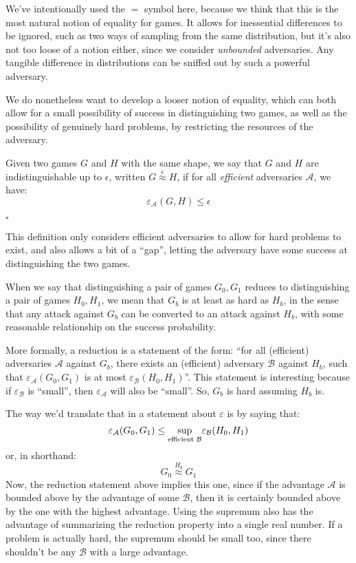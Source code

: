 We've intentionally used the $=$ symbol here, because we think that
this is the most natural notion of equality for games.
It allows for inessential differences to be ignored,
such as two ways of sampling from the same distribution,
but it's also not too loose of a notion either, since we consider
\emph{unbounded} adversaries.
Any tangible difference in distributions can be sniffed out by
such a powerful adversary.

We do nonetheless want to develop a looser notion of equality,
which can both allow for a small possibility of success
in distinguishing two games, as well as the possibility of genuinely
hard problems, by restricting the resources of the adversary.

\begin{definition}
    Given two games $G$ and $H$ with the same shape,
    we say that $G$ and $H$ are indistinguishable up to $\epsilon$,
    written $G \overset{\epsilon}{\approx} H$, if for all \emph{efficient}
    adversaries $\mathcal{A}$, we have:
    $$
    \varepsilon_{\mathcal{A}}(G, H) \leq \epsilon
    $$

    $\square$
\end{definition}

This definition only considers efficient adversaries to allow for
hard problems to exist, and also allows a bit of a ``gap'',
letting the adversary have some success at distinguishing
the two games.

When we say that distinguishing a pair of games $G_0, G_1$ reduces
to distinguishing a pair of games $H_0, H_1$, we mean that
$G_b$ is at least as hard as $H_b$, in the sense that
any attack against $G_b$ can be converted to an attack against $H_b$,
with some reasonable relationship on the success probability.

More formally, a reduction is a statement of the form:
``for all (efficient) adversaries $\mathcal{A}$
against $G_b$, there exists an (efficient) adversary $\mathcal{B}$
against $H_b$, such that $\varepsilon_{\mathcal{A}}(G_0, G_1)$
is at most $\varepsilon_{\mathcal{B}}(H_0, H_1)$''.
This statement is interesting because if $\varepsilon_{\mathcal{B}}$
is ``small'', then $\varepsilon_{\mathcal{A}}$ will also be ``small''.
So, $G_b$ is hard assuming $H_b$ is.

The way we'd translate that in a statement about $\varepsilon$ is by saying
that:
$$
\varepsilon_{\mathcal{A}}(G_0, G_1) \leq \underset{\text{efficient } \mathcal{B}}{\text{sup}} \varepsilon_{\mathcal{B}}(H_0, H_1)
$$
or, in shorthand:
$$
G_0 \overset{H_b}{\approx} G_1
$$
Now, the reduction statement above implies this one,
since if the advantage $\mathcal{A}$ is bounded above by the advantage
of some $\mathcal{B}$, then it is certainly bounded above by the one with
the highest advantage.
Using the supremum also has the advantage of summarizing the reduction
property into a single real number.
If a problem is actually hard, the supremum should be small too,
since there shouldn't 
be any $\mathcal{B}$ with a large advantage.

